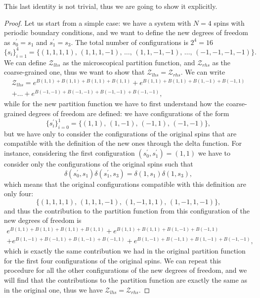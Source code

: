 This last identity is not trivial, thus we are going to show it explicitly.
\begin{proof}
    Let us start from a simple case: we have a system with \(N = 4\) spins with periodic boundary conditions, and we want to define the new degrees of freedom as \(s_0^{\prime} = s_1\) and \(s_1^{\prime} = s_3\). The total number of configurations is \(2^4 = 16\)
    \[
        \{s_i\}_{i=1}^4 = \{(1,1,1,1),\,(1,1,1,-1),\,\dots,\, (1,1,-1,-1),\,\dots,\,(-1,-1,-1,-1)\}.
    \]
    We can define \(\mathcal{Z}_{lhs}\) as the microscopical partition function, and \(\mathcal{Z}_{rhs}\) as the coarse-grained one, thus we want to show that \(\mathcal{Z}_{lhs} = \mathcal{Z}_{rhs}\). We can write
    \[
        \begin{aligned}
            \mathcal{Z}_{lhs} = e^{B(1,1) + B(1,1) + B(1,1) + B(1,1)} + e^{B(1,1) + B(1,1) + B(1,-1) + B(-1,1)} \\
            + \dots + e^{B(-1,-1) + B(-1,-1) + B(-1,-1) + B(-1,-1)},
        \end{aligned}
    \]
    while for the new partition function we have to first understand how the coarse-grained degrees of freedom are defined: we have configurations of the form
    \[
        \{s^{\prime}_i\}_{i=0}^1 = \{(1,1),\,(1,-1),\,(-1,1),\,(-1,-1)\},
    \]
    but we have only to consider the configurations of the original spins that are compatible with the definition of the new ones through the delta function. For instance, considering the first configuration \((s_0^{\prime}, s_1^{\prime}) = (1,1)\) we have to consider only the configurations of the original spins such that
    \[
        \delta(s_0^{\prime}, s_1) \delta(s_1^{\prime}, s_3) = \delta(1, s_1) \delta(1, s_3),
    \]
    which means that the original configurations compatible with this definition are only four:
    \[
        \{(1,1,1,1),\,(1,1,1,-1),\,(1,-1,1,1),\,(1,-1,1,-1)\},
    \]
    and thus the contribution to the partition function from this configuration of the new degrees of freedom is
    \[
        \begin{aligned}
            e^{B(1,1) + B(1,1) + B(1,1) + B(1,1)} + e^{B(1,1) + B(1,1) + B(1,-1) + B(-1,1)} \\
            + e^{B(1,-1) + B(-1,1) + B(1,-1) + B(-1,1)} + e^{B(1,-1) + B(-1,1) + B(1,-1) + B(-1,-1)},
        \end{aligned}
    \]
    which is exactly the same contribution we had in the original partition function for the first four configurations of the original spins. We can repeat this procedure for all the other configurations of the new degrees of freedom, and we will find that the contributions to the partition function are exactly the same as in the original one, thus we have \(\mathcal{Z}_{lhs} = \mathcal{Z}_{rhs}\).


\end{proof}
